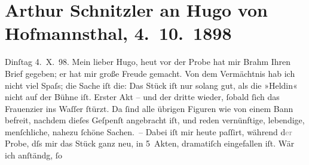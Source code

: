 

         
         \renewcommand{\erwaehntePersonen}{Personen: Otto Brahm, Hugo von Hofmannsthal}
         \renewcommand{\erwaehnteOrte}{Orte: Berlin, Bologna, Le due Torri: Garisenda e degli Asinelli, Wien}
         \renewcommand{\erwaehnteWerke}{Werke: Das Vermächtnis. Schauspiel in drei Akten, Der Abenteurer und die Sängerin oder Die Geschenke des Lebens}
               \section[Arthur Schnitzler an Hugo von Hofmannsthal, 4. 10. 1898]{ Arthur Schnitzler an Hugo von Hofmannsthal, 4. 10. 1898}\nopagebreak{}\rehead{ }\begin{ledgroupsized}[t]{13cm}\normalsize\beginnumbering \toendnotes[C]{\smallbreak\pagebreak[2]} 
\toendnotes[C]{\smallbreak}\pstart
           {\pb}Dinſtag 4. X. 98.\pend
           \pstart
           Mein lieber Hugo, heut vor der Probe hat mir Brahm Ihren Brief gegeben; er hat mir große Freude gemacht. Von
               dem Vermächtnis hab ich nicht viel Spaſs; die
               Sache iſt die: Das Stück iſt nur solang gut, als die »Heldin« nicht auf der Bühne
               iſt. Erster Akt – und der dritte wieder, ſobald ſich das Frauenzi{\geminationm}er ins {\pb}Waſſer ſtürzt. Da
               ſind alle übrigen Figuren wie von einem Bann befreit, nachdem dieſes Geſpenſt
               angebracht iſt, und reden vernünftige, lebendige, menſchliche, nahezu ſchöne
               Sachen. – Dabei iſt mir heute paſſirt, während d\textcolor{gray}{er} Probe, dſs mir
               das Stück ganz neu, in 5 {\pb}Akten, dramatiſch eingefallen iſt. Wär ich anſtändg, ſo

\end{ledgroupsized}
